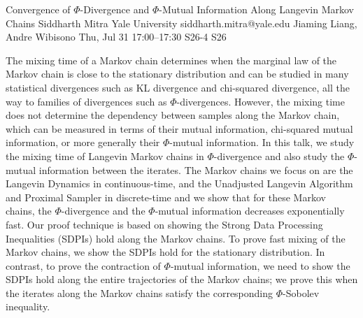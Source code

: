 \documentclass[12pt,lettersize,oneside]{book} %
\begin{document}
\begin{talk}
  {Convergence of $\Phi$-Divergence and $\Phi$-Mutual Information Along Langevin Markov Chains}%
  {Siddharth Mitra}%
  {Yale University}%
  {siddharth.mitra@yale.edu}%
  {Jiaming Liang, Andre Wibisono}%
  {}%
  {Thu, Jul 31 17:00--17:30}%
  {S26-4}%
  {S26}%
  
    
   
The mixing time of a Markov chain determines when the marginal law of the Markov chain is close to the stationary distribution and can be studied in many statistical divergences such as KL divergence and chi-squared divergence, all the way to families of divergences such as $\Phi$-divergences. However, the mixing time does not determine the dependency between samples along the Markov chain, which can be measured in terms of their mutual information, chi-squared mutual information, or more generally their $\Phi$-mutual information. In this talk, we study the mixing time of Langevin Markov chains in $\Phi$-divergence and also study the $\Phi$-mutual information between the iterates. The Markov chains we focus on are the Langevin Dynamics in continuous-time, and the Unadjusted Langevin Algorithm and Proximal Sampler in discrete-time and we show that for these Markov chains, the $\Phi$-divergence and the $\Phi$-mutual information decreases exponentially fast. Our proof technique is based on showing the Strong Data Processing Inequalities (SDPIs) hold along the Markov chains. To prove fast mixing of the Markov chains, we show the SDPIs hold for the stationary distribution. In contrast, to prove the contraction of $\Phi$-mutual information, we need to show the SDPIs hold along the entire trajectories of the Markov chains; we prove this when the iterates along the Markov chains satisfy the corresponding $\Phi$-Sobolev inequality.


\medskip


\end{talk}
\end{document}
